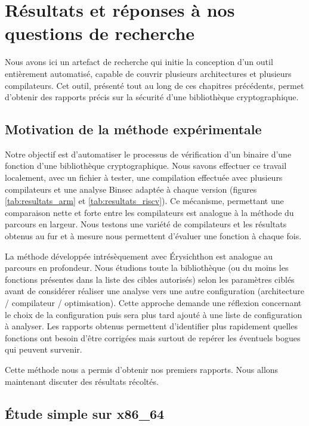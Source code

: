 \chapter{Résultats et réponses à nos questions de recherche}

Nous avons ici un artefact de recherche qui initie la conception d'un outil entièrement automatisé, capable de couvrir plusieurs architectures et plusieurs compilateurs. Cet outil, présenté tout au long de ces chapitres précédents, permet d'obtenir des rapports précis sur la sécurité d'une bibliothèque cryptographique. 

\section{Motivation de la méthode expérimentale}

Notre objectif est d'automatiser le processus de vérification d'un binaire d'une fonction d'une bibliothèque cryptographique. Nous savons effectuer ce travail localement, avec un fichier à tester, une compilation effectuée avec plusieurs compilateurs et une analyse Binsec adaptée à chaque version (\eg figures \ref{tab:resultats_arm} et \ref{tab:resultats_riscv}). Ce mécanisme, permettant une comparaison nette et forte entre les compilateurs est analogue à la méthode du parcours en largeur. Nous testons une variété de compilateurs et les résultats obtenus au fur et à mesure nous permettent d'évaluer une fonction à chaque fois.\medbreak

La méthode développée intrésèquement avec Érysichthon est analogue au parcours en profondeur. Nous étudions toute la bibliothèque (ou du moins les fonctions présentes dans la liste des cibles autorisés) selon les paramètres ciblés avant de considérer réaliser une analyse vers une autre configuration (architecture / compilateur / optimisation). Cette approche demande une réflexion concernant le choix de la configuration puis sera plus tard ajouté à une liste de configuration à analyser. Les rapports obtenus permettent d'identifier plus rapidement quelles fonctions ont besoin d'être corrigées mais surtout de repérer les éventuels bogues qui peuvent survenir.\smallbreak

Cette méthode nous a permis d'obtenir nos premiers rapports. Nous allons maintenant discuter des résultats récoltés.

\section{Étude simple sur x86\_64}

